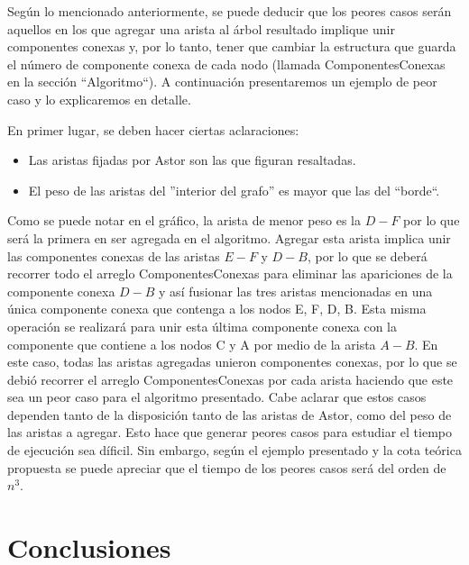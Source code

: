 \documentclass[a4paper,11pt] {article}
\begin{document}
Seg\'un lo mencionado anteriormente, se puede deducir que los peores casos ser\'an aquellos en los que agregar una arista al \'arbol resultado implique unir componentes conexas y, por lo tanto, tener que cambiar la estructura que guarda el n\'umero de componente conexa de cada nodo (llamada ComponentesConexas en la secci\'on ``Algoritmo``). A continuaci\'on presentaremos un ejemplo de peor caso y lo explicaremos en detalle.


En primer lugar, se deben hacer ciertas aclaraciones: 
\begin{itemize}
 \item Las aristas fijadas por Astor son las que figuran resaltadas.
 \item El peso de las aristas del ''interior del grafo'' es mayor que las del ``borde``.
\end{itemize}

Como se puede notar en el gr\'afico, la arista de menor peso es la $D-F$ por lo que ser\'a la primera en ser agregada en el algoritmo. Agregar esta arista implica unir las componentes conexas de las aristas $E-F$ y $D-B$, por lo que se deber\'a recorrer todo el arreglo ComponentesConexas para eliminar las apariciones de la componente conexa $D-B$ y as\'i fusionar las tres aristas mencionadas en una \'unica componente conexa que contenga a los nodos E, F, D, B. Esta misma operaci\'on se realizar\'a para unir esta \'ultima componente conexa con la componente que contiene a los nodos C y A por medio de la arista $A-B$. En este caso, todas las aristas agregadas unieron componentes conexas, por lo que se debi\'o recorrer el arreglo ComponentesConexas por cada arista haciendo que este sea un peor caso para el algoritmo presentado. Cabe aclarar que estos casos dependen tanto de la disposici\'on tanto de las aristas de Astor, como del peso de las aristas a agregar. Esto hace que generar peores casos para estudiar el tiempo de ejecuci\'on sea d\'ificil. Sin embargo, seg\'un el ejemplo presentado y la cota te\'orica propuesta se puede apreciar que el tiempo de los peores casos ser\'a del orden de $n^{3}$.

\section*{Conclusiones}
\end{document}

